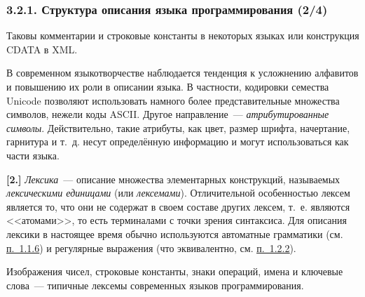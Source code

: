 \documentclass[mathserif,12pt,aspectratio=169]{beamer}
\renewcommand{\index}[1]{}
\def\odmkey#1#2{{\it\color{red} #1}\index{#2}}
\def\DMref#1#2{{\color{blue}\underline{\hyperlink{#2}{#1}}}}
\begin{document}
\begin{frame}
\frametitle{3.2.1. Структура описания языка программирования (2/4)}
\begin{example} Таковы
 комментарии и строковые константы в некоторых языках или
конструкция CDATA в XML.
\end{example}
\begin{digress}
В современном языкотворчестве наблюдается тенденция
к усложнению алфавитов и повышению их роли в описании языка.
В частности, кодировки семества Unicode позволяют
использовать намного более представительные множества символов,
нежели коды ASCII.
Другое направление~--- \odmkey{атрибутированные символы}{Атрибут!символа}.
Действительно, такие атрибуты, как цвет, размер шрифта, начертание, 
гарнитура и т.~д. несут определённую информацию и могут использоваться как 
части языка.  
\end{digress}

\smallskip
{\color{blue}\bf [2.]} \odmkey{Лексика}{Лексика}~--- описание множества
элементарных конструкций, называемых \odmkey{лексическими
единицами}{Лексическая единица} (или \odmkey{лексемами}{Лексема}).
Отличительной особенностью лексем является то, что они не содержат
в своем составе других лексем, т.~е. являются <<атомами>>,
то есть терминалами с точки зрения синтаксиса.
  Для
описания лексики в настоящее время обычно используются автоматные
грамматики (см. \DMref{п.~1.1.6}{1.1.6.}) и регулярные выражения (что
эквивалентно, см. \DMref{п.~1.2.2}{1.2.2.}).
\begin{example} Изображения чисел,
строковые константы, знаки операций, имена и ключевые слова~--- типичные лексемы
современных языков программирования.
\end{example}

\end{frame}
\end{document}
